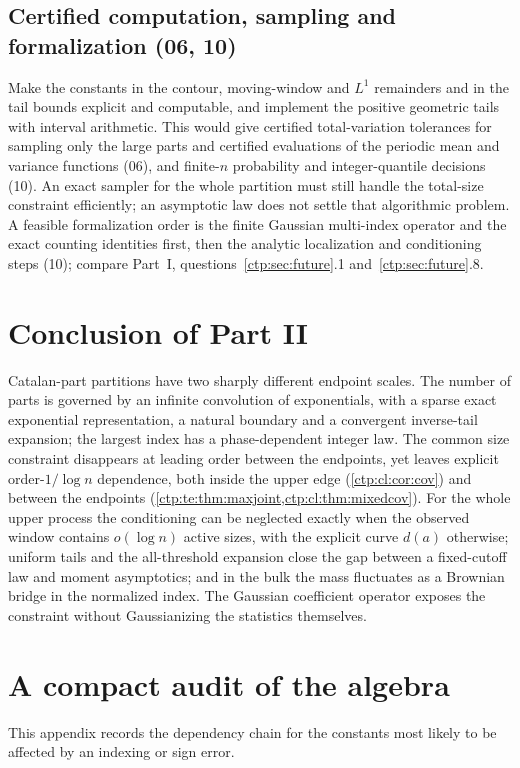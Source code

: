\documentclass[11pt,a4paper]{article}
\numberwithin{equation}{section}
\theoremstyle{definition}
\theoremstyle{remark}
\begin{document}
\subsection{Certified computation, sampling and formalization (06, 10)}
Make the constants in the contour, moving-window and $L^1$ remainders and in
the tail bounds explicit and computable, and implement the positive geometric
tails with interval arithmetic. This would give certified total-variation
tolerances for sampling only the large parts and certified evaluations of the
periodic mean and variance functions (06), and finite-$n$ probability and
integer-quantile decisions (10). An exact sampler for the whole partition
must still handle the total-size constraint efficiently; an asymptotic law
does not settle that algorithmic problem. A feasible formalization order is
the finite Gaussian multi-index operator and the exact counting identities
first, then the analytic localization and conditioning steps (10); compare
Part~I, questions~\ref{ctp:sec:future}.1 and~\ref{ctp:sec:future}.8.

\section{Conclusion of Part II}
\label{ctp:cl:sec:conclusion}

Catalan-part partitions have two sharply different endpoint scales. The
number of parts is governed by an infinite convolution of exponentials, with
a sparse exact exponential representation, a natural boundary and a
convergent inverse-tail expansion; the largest index has a phase-dependent
integer law. The common size constraint disappears at leading order between
the endpoints, yet leaves explicit order-$1/\log n$ dependence, both inside
the upper edge (\cref{ctp:cl:cor:cov}) and between the endpoints
(\cref{ctp:te:thm:maxjoint,ctp:cl:thm:mixedcov}). For the whole upper
process the conditioning can be neglected exactly when the observed window
contains $o(\log n)$ active sizes, with the explicit curve $d(a)$ otherwise;
uniform tails and the all-threshold expansion close the gap between a
fixed-cutoff law and moment asymptotics; and in the bulk the mass fluctuates
as a Brownian bridge in the normalized index. The Gaussian coefficient
operator exposes the constraint without Gaussianizing the statistics
themselves.

\appendix
{}%
\section{A compact audit of the algebra}
\label{ctp:app:audit}
This appendix records the dependency chain for the constants most likely
to be affected by an indexing or sign error.
\end{document}
